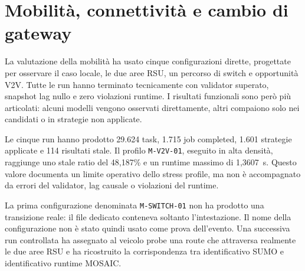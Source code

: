 \FloatBarrier

\section{Mobilità, connettività e cambio di gateway}
\label{sec:exp_mobilita}

La valutazione della mobilità ha usato cinque configurazioni dirette, progettate per osservare il caso locale, le due aree RSU, un percorso di switch e opportunità V2V. Tutte le run hanno terminato tecnicamente con validator superato, snapshot lag nullo e zero violazioni runtime. I risultati funzionali sono però più articolati: alcuni modelli vengono osservati direttamente, altri compaiono solo nei candidati o in strategie non applicate.

Le cinque run hanno prodotto 29.624 task, 1.715 job completed, 1.601 strategie applicate e 114 risultati stale. Il profilo \texttt{M-V2V-01}, eseguito in alta densità, raggiunge uno stale ratio del 48,187\% e un runtime massimo di 1,3607~s. Questo valore documenta un limite operativo dello stress profile, ma non è accompagnato da errori del validator, lag causale o violazioni del runtime.

La prima configurazione denominata \texttt{M-SWITCH-01} non ha prodotto una transizione reale: il file dedicato conteneva soltanto l'intestazione. Il nome della configurazione non è stato quindi usato come prova dell'evento. Una successiva run controllata ha assegnato al veicolo probe una route che attraversa realmente le due aree RSU e ha ricostruito la corrispondenza tra identificativo SUMO e identificativo runtime MOSAIC.

